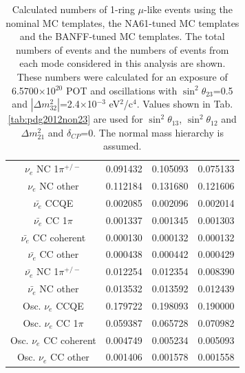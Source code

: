 \begin{table}
\begin{tabular}{| c |  D{.}{.}{-1} |  D{.}{.}{-1} |  D{.}{.}{-1} | }
$\nu_e$ NC 1$\pi^{+/-}$ & 0.091432 & 0.105093 & 0.075133 \\ 
$\nu_e$ NC other & 0.112184 & 0.131680 & 0.121606 \\ 
$\bar{\nu_e}$ CCQE & 0.002085 & 0.002096 & 0.002014 \\ 
$\bar{\nu_e}$ CC 1$\pi$ & 0.001337 & 0.001345 & 0.001303 \\ 
$\bar{\nu_e}$ CC coherent & 0.000130 & 0.000132 & 0.000132 \\ 
$\bar{\nu_e}$ CC other & 0.000438 & 0.000442 & 0.000429 \\ 
$\bar{\nu_e}$ NC 1$\pi^{+/-}$ & 0.012254 & 0.012354 & 0.008390 \\ 
$\bar{\nu_e}$ NC other & 0.013532 & 0.013592 & 0.012439 \\ 
Osc. $\nu_e$ CCQE & 0.179722 & 0.198093 & 0.190000 \\ 
Osc. $\nu_e$ CC 1$\pi$ & 0.059387 & 0.065728 & 0.070982 \\ 
Osc. $\nu_e$ CC coherent & 0.004749 & 0.005234 & 0.005093 \\ 
Osc. $\nu_e$ CC other & 0.001406 & 0.001578 & 0.001558 \\ 
\hline
\end{tabular}
\caption{
Calculated numbers of 1-ring $\mu$-like events using the nominal MC templates, the NA61-tuned MC templates
and the BANFF-tuned MC templates.
The total numbers of events and the numbers of events from each mode considered in this analysis are shown.
These numbers were calculated for an exposure of 6.5700$\times$10$^{20}$ POT
and oscillations with $\sin^{2}\theta_{23}$=0.5 and $|\Delta m^{2}_{32}|$=2.4$\times$10$^{-3}$ eV$^{2}$/c$^{4}$.
Values shown in Tab. \ref{tab:pdg2012non23} are used for $\sin^{2}\theta_{13}$, $\sin^{2}\theta_{12}$ and $\Delta m^{2}_{21}$ and $\delta_{CP}$=0.
The normal mass hierarchy is assumed.
}
\label{tab:nsk_nominal_x3_default_osc}
\end{table}
